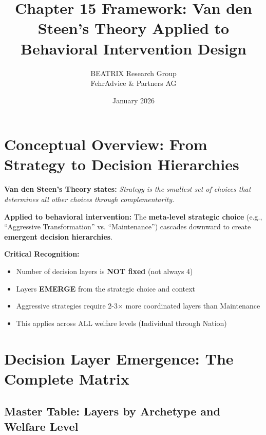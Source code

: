 \documentclass[11pt, a4paper]{article}
\title{Chapter 15 Framework: Van den Steen's Theory Applied to Behavioral Intervention Design}
\author{BEATRIX Research Group \\ FehrAdvice \& Partners AG}
\date{January 2026}
\begin{document}
\maketitle

\section*{Conceptual Overview: From Strategy to Decision Hierarchies}

\begin{tcolorbox}[colback=blue!5!white, colframe=blue!75!black, title=Core Insight]

\textbf{Van den Steen's Theory states:} \textit{Strategy is the smallest set of choices that determines all other choices through complementarity.}

\textbf{Applied to behavioral intervention:} The \textbf{meta-level strategic choice} (e.g., ``Aggressive Transformation'' vs. ``Maintenance'') cascades downward to create \textbf{emergent decision hierarchies}.

\textbf{Critical Recognition:}
\begin{itemize}[nosep]
    \item Number of decision layers is \textbf{NOT fixed} (not always 4)
    \item Layers \textbf{EMERGE} from the strategic choice and context
    \item Aggressive strategies require 2-3$\times$ more coordinated layers than Maintenance
    \item This applies across ALL welfare levels (Individual through Nation)
\end{itemize}

\end{tcolorbox}

\section{Decision Layer Emergence: The Complete Matrix}

\subsection{Master Table: Layers by Archetype and Welfare Level}
\end{document}
